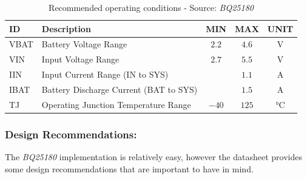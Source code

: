 \documentclass[report.tex]{subfiles}
\begin{document}
\begin{table}[H]
\centering
\begin{tabularx}{\textwidth}{|l|X|c|c|c|}\hline
\textbf{ID} & \textbf{Description} & \textbf{MIN} & \textbf{MAX} & \textbf{UNIT} \\\hline
VBAT & Battery Voltage Range & $2.2$ & $4.6$ & $\si{\volt}$ \\\hline
VIN & Input Voltage Range & $2.7$&  $5.5$ & $\si{\volt}$ \\\hline
IIN & Input Current Range (IN to SYS) & & $1.1$  & $\si{\ampere}$ \\\hline
IBAT & Battery Discharge Current (BAT to SYS) & & $1.5$ & $\si{\ampere}$ \\\hline
TJ & Operating Junction Temperature Range & $-40$ & $125$ & $\si{\celsius}$ \\\hline
\end{tabularx}
\caption{Recommended operating conditions - Source: \textit{BQ25180}\cite{bq25180DS}}
\label{tab:bq25180_recom_oper_cond}
\end{table}

\subsubsection{Design Recommendations:} \label{sec:bat_chrg_sel}
The \textit{BQ25180} implementation is relatively easy, however the datasheet provides some design recommendations that are important to have in mind.\\
\end{document}
